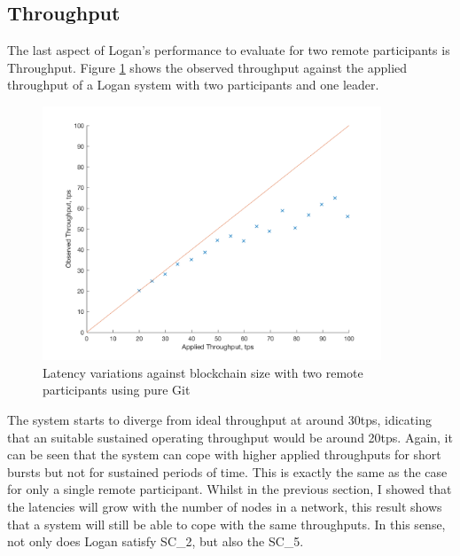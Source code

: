 \documentclass[12pt,a4paper,twoside,openright]{report}
\begin{document}
	\subsection{Throughput}
	The last aspect of Logan's performance to evaluate for two remote participants is Throughput.
	Figure \ref{figs:tworemthrthr} shows the observed throughput against the applied throughput of a Logan system with two participants and one leader.
	\begin{figure}
		\centering
		\includegraphics[width=0.9\textwidth]{figs/appliedvsobserved2r.png}
		\caption{Latency variations against blockchain size with two remote participants using pure Git}
		\label{figs:tworemthrthr}
	\end{figure}
	The system starts to diverge from ideal throughput at around 30tps, idicating that an suitable sustained operating throughput would be around 20tps.
	Again, it can be seen that the system can cope with higher applied throughputs for short bursts  but not for sustained periods of time. 
	This is exactly the same as the case for only a single remote participant. 
	Whilst in the previous section, I showed that the latencies will grow with the number of nodes in a network, this result shows that a system will still be able to cope with the same throughputs. 
	In this sense, not only does Logan satisfy SC\_2, but also the SC\_5.
\end{document}
